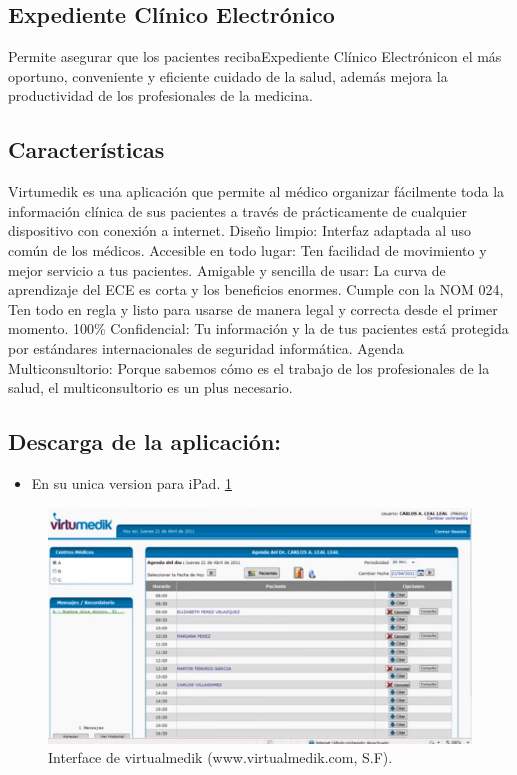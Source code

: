 \subsection{Expediente Clínico Electrónico}
Permite asegurar que los pacientes recibaExpediente Clínico Electrónicon el más oportuno, conveniente y eficiente cuidado de la salud, además mejora la productividad de los profesionales de la medicina. \cite{Villareal}

\subsection{Características}
Virtumedik es una aplicación que permite al médico organizar fácilmente toda la información clínica de sus pacientes a través de prácticamente de cualquier dispositivo con conexión a internet.
Diseño limpio: Interfaz adaptada al uso común de los médicos.
Accesible en todo lugar: Ten facilidad de movimiento y mejor servicio a tus pacientes.
Amigable y sencilla de usar: La curva de aprendizaje del ECE es corta y los beneficios enormes.
Cumple con la NOM 024, Ten todo en regla y listo para usarse de manera legal y correcta desde el primer momento.
100\% Confidencial: Tu información y la de tus pacientes está protegida por estándares internacionales de seguridad informática.
Agenda Multiconsultorio: Porque sabemos cómo es el trabajo de los profesionales de la salud, el multiconsultorio es un plus necesario.\cite{Villareal}
\subsection{Descarga de la aplicación:}
\begin{itemize}
  \item En su unica version para iPad.
  \ref{figura2}
\end{itemize}

\begin{figure}[h]
  \centering
  \label{figura2}
  \includegraphics[scale=1]{lib/assets/2}
  \caption{Interface de virtualmedik (www.virtualmedik.com, S.F).}
\end{figure}

